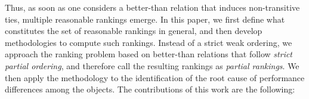 \documentclass[acmsmall,screen, review]{acmart}
\begin{document}
Thus, as soon as one considers a better-than relation that induces non-transitive ties, multiple reasonable rankings emerge. In this paper, we first define what constitutes the set of reasonable rankings in general, and then develop methodologies to compute such rankings. Instead of a strict weak ordering, we approach the ranking problem based on better-than relations that follow \textit{strict partial ordering}, and therefore call the resulting rankings as \textit{partial rankings}. We then apply the methodology to the identification of the root cause of performance differences among the objects.
The contributions of this work are the following:
\end{document}
